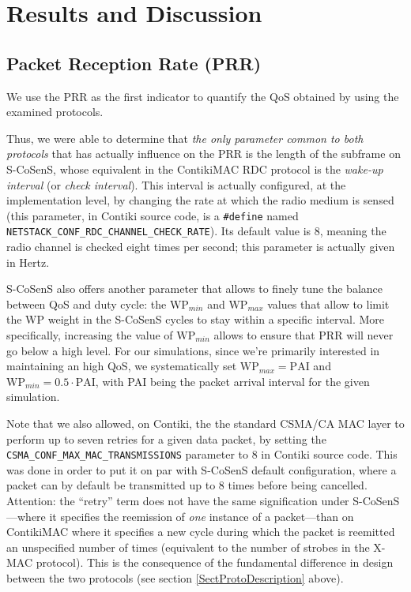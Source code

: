 \documentclass[12pt,a4paper]{article}
\begin{document}

\section{Results and Discussion}
\label{SectResults}

\subsection{Packet Reception Rate (PRR)}

We use the PRR as the first indicator to quantify the QoS obtained by
using the examined protocols.

Thus, we were able to determine that \emph{the only parameter common to
both protocols} that has actually influence on the PRR is the length of
the subframe on S-CoSenS, whose equivalent in the ContikiMAC RDC protocol
is the \emph{wake-up interval} (or \emph{check interval}). This interval
is actually configured, at the implementation level, by changing the rate
at which the radio medium is sensed (this parameter, in Contiki source code,
is a \texttt{\#define} named
\texttt{NETSTACK\_CONF\_RDC\_CHANNEL\_CHECK\_RATE}).
Its default value is 8, meaning the radio channel is checked eight times
per second; this parameter is actually given in Hertz.

S-CoSenS also offers another parameter that allows to finely tune the
balance between QoS and duty cycle: the $\mathrm{WP}_{min}$ and
$\mathrm{WP}_{max}$ values that allow to limit the WP weight in the
S-CoSenS cycles to stay within a specific interval. More specifically,
increasing the value of $\mathrm{WP}_{min}$ allows to ensure that PRR
will never go below a high level. For our simulations, since we're
primarily interested in maintaining an high QoS, we systematically
set $\mathrm{WP}_{max} = \mathrm{PAI}$ and $\mathrm{WP}_{min}
= 0.5 \cdot \mathrm{PAI}$, with PAI being the packet arrival
interval for the given simulation.

Note that we also allowed, on Contiki, the the standard CSMA/CA MAC layer
to perform up to seven retries for a given data packet, by setting the
\texttt{CSMA\_CONF\_MAX\_MAC\_TRANSMISSIONS}
parameter to 8 in Contiki source code. This was done in order to put it
on par with S-CoSenS default configuration, where a packet can by default
be transmitted up to 8 times before being cancelled.
Attention: the ``retry'' term does not have the same signification
under S-CoSenS---where it specifies the reemission of \emph{one} instance of
a packet---than on ContikiMAC where it specifies a new cycle during
which the packet is reemitted an unspecified number of times (equivalent
to the number of strobes in the X-MAC protocol). This is the consequence
of the fundamental difference in design between the two protocols
(see section \ref{SectProtoDescription} above).
\end{document}
